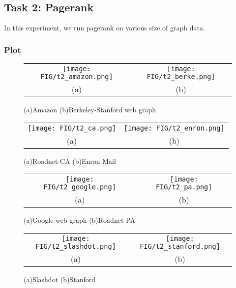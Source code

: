 \subsection{Task 2: Pagerank}
In this experiment, we run pagerank on various size of graph data.

\subsubsection{Plot}

\begin{figure}[h]
\begin{center}
\begin{tabular}{cc}
     \texttt{[image: FIG/t2\_amazon.png]} &
     \texttt{[image: FIG/t2\_berke.png]} \\
    (a) & (b) 
\end{tabular}
\caption{(a)Amazon (b)Berkeley-Stanford web graph}
\label{t2:1}
\end{center}
\end{figure}

\begin{figure}[h]
\begin{center}
\begin{tabular}{cc}
     \texttt{[image: FIG/t2\_ca.png]} &
     \texttt{[image: FIG/t2\_enron.png]} \\
    (a) & (b) 
\end{tabular}
\caption{(a)Roadnet-CA (b)Enron Mail}
\label{t2:2}
\end{center}
\end{figure}

\begin{figure}[h]
\begin{center}
\begin{tabular}{cc}
     \texttt{[image: FIG/t2\_google.png]} &
     \texttt{[image: FIG/t2\_pa.png]} \\
    (a) & (b) 
\end{tabular}
\caption{(a)Google web graph (b)Roadnet-PA}
\label{t2:3}
\end{center}
\end{figure}

\begin{figure}[h]
\begin{center}
\begin{tabular}{cc}
     \texttt{[image: FIG/t2\_slashdot.png]} &
     \texttt{[image: FIG/t2\_stanford.png]} \\
    (a) & (b) 
\end{tabular}
\caption{(a)Slashdot (b)Stanford}
\label{t2:4}
\end{center}
\end{figure}

